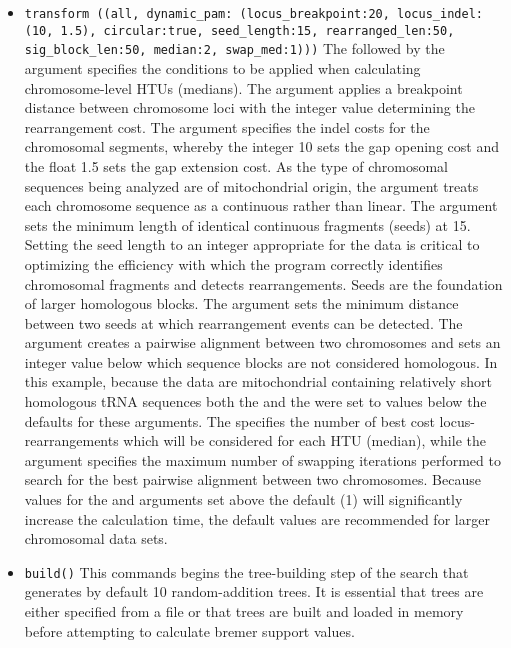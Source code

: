 \begin{itemize}
\item \texttt{transform ((all, dynamic\_pam: (locus\_breakpoint:20, locus\_indel:(10, 1.5), circular:true, seed\_length:15, rearranged\_len:50, sig\_block\_len:50, median:2, swap\_med:1)))}  The  followed by the argument  specifies the conditions to be applied when calculating chromosome-level HTUs (medians).  The argument  applies a breakpoint distance between chromosome loci with the integer value determining the rearrangement cost. The argument  specifies the indel costs for the chromosomal segments, whereby the integer 10 sets the gap opening cost and the float 1.5 sets the gap extension cost.  As the type of chromosomal sequences being analyzed are of mitochondrial origin, the argument  treats each chromosome sequence as a continuous rather than linear. The argument  sets the minimum length of identical continuous fragments (seeds) at 15.  Setting the seed length to an integer appropriate for the data is critical to optimizing the efficiency with which the program correctly identifies chromosomal fragments and detects rearrangements.  Seeds are the foundation of larger homologous blocks.  The  argument sets the minimum distance between two seeds at which rearrangement events can be detected.  The argument  creates a pairwise alignment between two chromosomes and sets an integer value below which sequence blocks are not considered homologous.  In this example, because the data are mitochondrial containing relatively short homologous tRNA sequences both the  and the  were set to values below the defaults for these arguments.  The  specifies the number of best cost locus-rearrangements which will be considered for each HTU (median), while the  argument specifies the maximum number of swapping iterations performed to search for the best pairwise alignment between two chromosomes.  Because values for the  and  arguments set above the default (1) will significantly increase the calculation time, the default values are recommended for larger chromosomal data sets.
\item \texttt{build()} This commands begins the tree-building step of the search that generates by default 10 random-addition trees.  It is essential that trees are either specified from a file or that trees are built and loaded in memory before attempting to calculate bremer support values.

\end{itemize}
